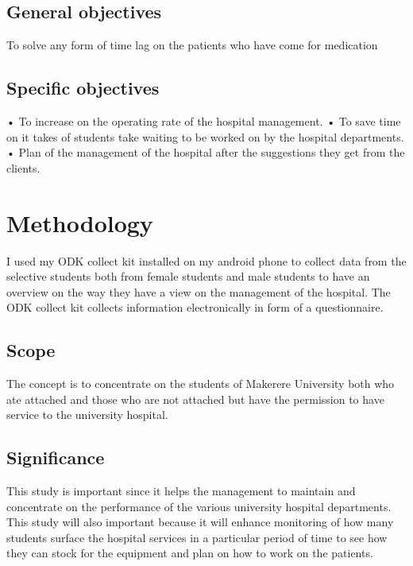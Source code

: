 \documentclass[12]{article}
\begin{document}
\subsection{General objectives}
To solve any form of time lag on the patients who have come for medication
\subsection{Specific objectives}
•	To increase on the operating rate of the hospital management.
•	To save time on it takes of students take waiting to be worked on by the hospital departments.
•	Plan of the management of the hospital after the suggestions they get from the clients.

\section{Methodology}
I used my ODK collect kit installed on my android phone to collect data from the selective students both from female students and male students to have an overview on the way they have a view on the management of the hospital. The ODK collect kit collects information electronically in form of a questionnaire.

\subsection{Scope}
The concept is to concentrate on the students of Makerere University both who ate attached and those who are not attached but have the permission to have service to the university hospital.

\subsection{Significance}
This study is important since it helps the management to maintain and concentrate on the performance of the various university hospital departments.
This study will also important because it will enhance monitoring of how many students surface the hospital services in a particular period of time to see how they can stock for the equipment and plan on how to work on the patients.
\end{document}
